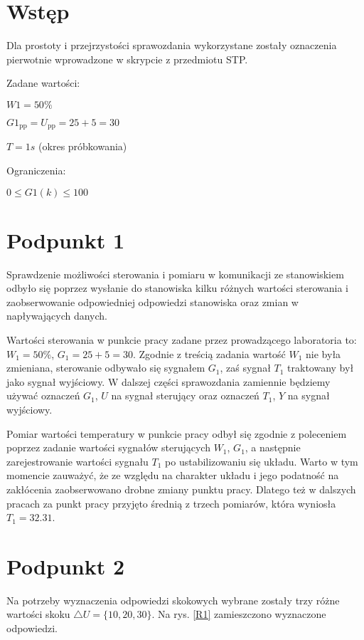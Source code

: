 \chapter{Wstęp}
Dla prostoty i przejrzystości sprawozdania wykorzystane zostały oznaczenia pierwotnie wprowadzone w skrypcie z przedmiotu STP.

\bigskip

Zadane wartości:

\smallskip

$W1=50\%$

\smallskip

$G1_{\mathrm{pp}}=U_{\mathrm{pp}}=25+5=30$

\smallskip

$T=1s$ (okres próbkowania)

\bigskip

Ograniczenia:

\smallskip

$0 \le G1(k) \le 100$

\chapter{Podpunkt 1}
Sprawdzenie możliwości sterowania i pomiaru w komunikacji ze stanowiskiem odbyło się poprzez wysłanie do stanowiska kilku różnych wartości sterowania i zaobserwowanie odpowiedniej odpowiedzi stanowiska oraz zmian w napływających danych.

Wartości sterowania w punkcie pracy zadane przez prowadzącego laboratoria to: $W_1=50\%$, $G_1=25+5=30$. Zgodnie z treścią zadania wartość $W_1$ nie była zmieniana, sterowanie odbywało się sygnałem $G_1$, zaś sygnał $T_1$ traktowany był jako sygnał wyjściowy. W dalszej części sprawozdania zamiennie będziemy używać oznaczeń $G_1$, $U$ na sygnał sterujący oraz oznaczeń $T_1$, $Y$ na sygnał wyjściowy.

Pomiar wartości temperatury w punkcie pracy odbył się zgodnie z poleceniem poprzez zadanie wartości sygnałów sterujących $W_1$, $G_1$, a następnie zarejestrowanie wartości sygnału $T_1$ po ustabilizowaniu się układu. Warto w tym momencie zauważyć, że ze względu na charakter układu i jego podatność na zakłócenia zaobserwowano drobne zmiany punktu pracy. Dlatego też w dalszych pracach za punkt pracy przyjęto średnią z trzech pomiarów, która wyniosła $T_1=\num{32,31}$.


\chapter{Podpunkt 2}
Na potrzeby wyznaczenia odpowiedzi skokowych wybrane zostały trzy różne wartości skoku $\triangle U = \{10, 20, 30\}$. Na rys. \ref{R1} zamieszczono wyznaczone odpowiedzi.

